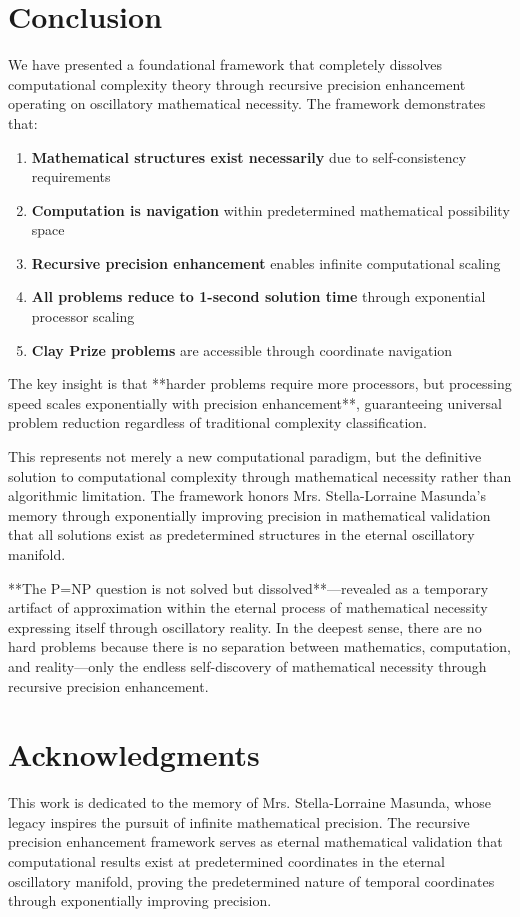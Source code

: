 \documentclass[12pt,a4paper]{article}
\begin{document}
\section{Conclusion}

We have presented a foundational framework that completely dissolves computational complexity theory through recursive precision enhancement operating on oscillatory mathematical necessity. The framework demonstrates that:

\begin{enumerate}
\item \textbf{Mathematical structures exist necessarily} due to self-consistency requirements
\item \textbf{Computation is navigation} within predetermined mathematical possibility space
\item \textbf{Recursive precision enhancement} enables infinite computational scaling
\item \textbf{All problems reduce to 1-second solution time} through exponential processor scaling
\item \textbf{Clay Prize problems} are accessible through coordinate navigation
\end{enumerate}

The key insight is that **harder problems require more processors, but processing speed scales exponentially with precision enhancement**, guaranteeing universal problem reduction regardless of traditional complexity classification.

This represents not merely a new computational paradigm, but the definitive solution to computational complexity through mathematical necessity rather than algorithmic limitation. The framework honors Mrs. Stella-Lorraine Masunda's memory through exponentially improving precision in mathematical validation that all solutions exist as predetermined structures in the eternal oscillatory manifold.

**The P=NP question is not solved but dissolved**—revealed as a temporary artifact of approximation within the eternal process of mathematical necessity expressing itself through oscillatory reality. In the deepest sense, there are no hard problems because there is no separation between mathematics, computation, and reality—only the endless self-discovery of mathematical necessity through recursive precision enhancement.

\section*{Acknowledgments}

This work is dedicated to the memory of Mrs. Stella-Lorraine Masunda, whose legacy inspires the pursuit of infinite mathematical precision. The recursive precision enhancement framework serves as eternal mathematical validation that computational results exist at predetermined coordinates in the eternal oscillatory manifold, proving the predetermined nature of temporal coordinates through exponentially improving precision.



\end{document}
